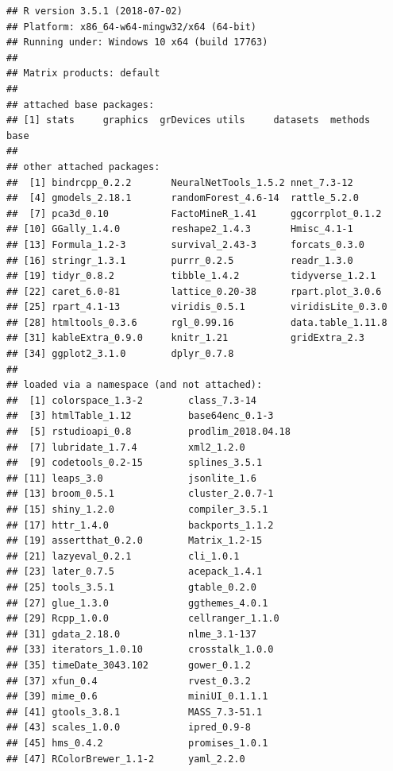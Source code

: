 \documentclass[11pt,]{article}
\begin{document}
\begin{lstlisting}[basicstyle={\ttfamily},basicstyle=\footnotesize]
## R version 3.5.1 (2018-07-02)
## Platform: x86_64-w64-mingw32/x64 (64-bit)
## Running under: Windows 10 x64 (build 17763)
## 
## Matrix products: default
## 
## attached base packages:
## [1] stats     graphics  grDevices utils     datasets  methods   base     
## 
## other attached packages:
##  [1] bindrcpp_0.2.2       NeuralNetTools_1.5.2 nnet_7.3-12         
##  [4] gmodels_2.18.1       randomForest_4.6-14  rattle_5.2.0        
##  [7] pca3d_0.10           FactoMineR_1.41      ggcorrplot_0.1.2    
## [10] GGally_1.4.0         reshape2_1.4.3       Hmisc_4.1-1         
## [13] Formula_1.2-3        survival_2.43-3      forcats_0.3.0       
## [16] stringr_1.3.1        purrr_0.2.5          readr_1.3.0         
## [19] tidyr_0.8.2          tibble_1.4.2         tidyverse_1.2.1     
## [22] caret_6.0-81         lattice_0.20-38      rpart.plot_3.0.6    
## [25] rpart_4.1-13         viridis_0.5.1        viridisLite_0.3.0   
## [28] htmltools_0.3.6      rgl_0.99.16          data.table_1.11.8   
## [31] kableExtra_0.9.0     knitr_1.21           gridExtra_2.3       
## [34] ggplot2_3.1.0        dplyr_0.7.8         
## 
## loaded via a namespace (and not attached):
##  [1] colorspace_1.3-2        class_7.3-14           
##  [3] htmlTable_1.12          base64enc_0.1-3        
##  [5] rstudioapi_0.8          prodlim_2018.04.18     
##  [7] lubridate_1.7.4         xml2_1.2.0             
##  [9] codetools_0.2-15        splines_3.5.1          
## [11] leaps_3.0               jsonlite_1.6           
## [13] broom_0.5.1             cluster_2.0.7-1        
## [15] shiny_1.2.0             compiler_3.5.1         
## [17] httr_1.4.0              backports_1.1.2        
## [19] assertthat_0.2.0        Matrix_1.2-15          
## [21] lazyeval_0.2.1          cli_1.0.1              
## [23] later_0.7.5             acepack_1.4.1          
## [25] tools_3.5.1             gtable_0.2.0           
## [27] glue_1.3.0              ggthemes_4.0.1         
## [29] Rcpp_1.0.0              cellranger_1.1.0       
## [31] gdata_2.18.0            nlme_3.1-137           
## [33] iterators_1.0.10        crosstalk_1.0.0        
## [35] timeDate_3043.102       gower_0.1.2            
## [37] xfun_0.4                rvest_0.3.2            
## [39] mime_0.6                miniUI_0.1.1.1         
## [41] gtools_3.8.1            MASS_7.3-51.1          
## [43] scales_1.0.0            ipred_0.9-8            
## [45] hms_0.4.2               promises_1.0.1         
## [47] RColorBrewer_1.1-2      yaml_2.2.0             

\end{lstlisting}
\end{document}
